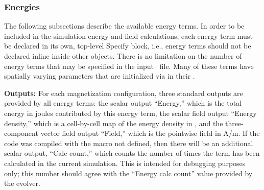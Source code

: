 \subsubsection{Energies}
The following subsections describe the available energy terms.  In
order to be included in the simulation energy and field calculations,
each energy term must be declared in its own, top-level Specify block,
i.e., energy terms should not be declared inline inside other
 objects.  There is no limitation on the number of energy
terms that may be specified in the input \MIF\ file.  Many of these
terms have spatially varying parameters that are initialized via
 in their
.

\textbf{Outputs:} For each magnetization configuration, three standard
outputs are provided by all energy terms: the scalar output
``Energy,'' which is the total energy in joules contributed by this
energy term, the scalar field output ``Energy density,'' which is a
cell-by-cell map of the energy density in
,
and the three-component vector field output ``Field,'' which is the
pointwise field in A/m.  If the code was compiled with the macro
 not defined, then there will be an additional scalar
output, ``Calc count,'' which counts the number of times the term has
been calculated in the current simulation.  This is intended for
debugging purposes only; this number should agree with the ``Energy
calc count'' value provided by the evolver.

